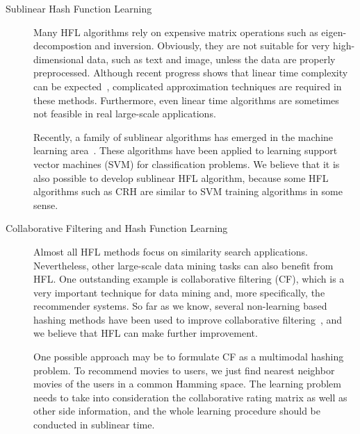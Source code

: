 \begin{description}
\item[Sublinear Hash Function Learning]
Many \mbox{HFL} algorithms rely on expensive matrix operations such as eigen-decompostion and inversion. Obviously, they are not suitable for very high-dimensional data, such as text and image, unless the data are properly preprocessed. Although recent progress shows that linear time complexity can be expected~\cite{lin2010cvpr}, complicated approximation techniques are required in these methods. Furthermore, even linear time algorithms are sometimes not feasible in real large-scale applications. 

Recently, a family of sublinear algorithms has emerged in the machine learning area~\cite{hazan2011nips}. These algorithms have been applied to learning support vector machines (\mbox{SVM}) for classification problems. We believe that it is also possible to develop sublinear \mbox{HFL} algorithm, because some \mbox{HFL} algorithms such as CRH are similar to \mbox{SVM} training algorithms in some sense.

\item[Collaborative Filtering and Hash Function Learning]
Almost all \mbox{HFL} methods focus on similarity search applications. Nevertheless, other large-scale data mining tasks can also benefit from \mbox{HFL}. One outstanding example is collaborative filtering (\mbox{CF}), which is a very important technique for data mining and, more specifically, the recommender systems. So far as we know, several non-learning based hashing methods have been used to improve collaborative filtering~\cite{shi2009aistats,weinberger2009icml}, and we believe that \mbox{HFL} can make further improvement.

One possible approach may be to formulate \mbox{CF} as a multimodal hashing problem. To recommend movies to users, we just find nearest neighbor movies of the users in a common Hamming space. The learning problem needs to take into consideration the collaborative rating matrix as well as other side information, and the whole learning procedure should be conducted in sublinear time.


\end{description}


